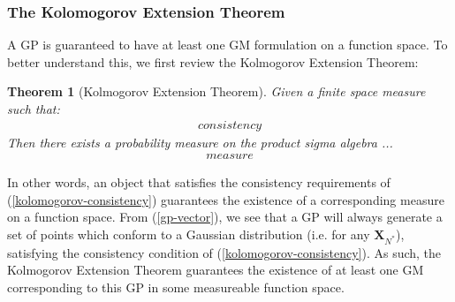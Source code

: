 \documentclass{article}
\newtheorem{theorem}{Theorem}
\numberwithin{equation}{section}
\begin{document}
\subsubsection{The Kolomogorov Extension Theorem}
A GP is guaranteed to have at least one GM formulation on a function space. To better understand this, we first review the Kolmogorov Extension Theorem:
\begin{theorem}[Kolmogorov Extension Theorem]
\label{kolomogorov-extension-theorem}
Given a finite space measure such that:
\begin{align}
    consistency 
    \label{kolomogorov-consistency}
\end{align}
Then there exists a probability measure on the product sigma algebra ... 
\begin{align}
    measure
    \label{kolomogorov-measure}
\end{align}
\end{theorem}
In other words, an object that satisfies the consistency requirements of (\ref{kolomogorov-consistency}) guarantees the existence of a corresponding measure on a function space. From (\ref{gp-vector}), we see that a GP will always generate a set of points which conform to a Gaussian distribution (i.e. for any $\mathbf{X}_{N^*}$), satisfying the consistency condition of (\ref{kolomogorov-consistency}). As such, the Kolmogorov Extension Theorem guarantees the existence of at least one GM corresponding to this GP in some measureable function space. 
\end{document}
